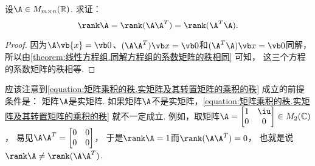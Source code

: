 \begin{example}
设\(\A \in M_{m \times n}(\mathbb{R})\).
求证：\begin{equation}\label{equation:矩阵乘积的秩.实矩阵及其转置矩阵的乘积的秩}
	\rank\A = \rank(\A\A^T) = \rank(\A^T\A).
\end{equation}
\begin{proof}
因为\(\A\vb{x}=\vb0\)、\((\A\A^T)\x=\vb0\)和\((\A^T\A)\x=\vb0\)同解，
所以由\cref{theorem:线性方程组.同解方程组的系数矩阵的秩相同} 可知，
这三个方程的系数矩阵的秩相等.
\end{proof}
\end{example}
\begin{remark}
应该注意到\cref{equation:矩阵乘积的秩.实矩阵及其转置矩阵的乘积的秩} 成立的前提条件是：
矩阵\(\A\)是实矩阵.
如果矩阵\(\A\)不是实矩阵，\cref{equation:矩阵乘积的秩.实矩阵及其转置矩阵的乘积的秩} 就不一定成立.
例如，取矩阵\(\A = \begin{bmatrix}
	1 & \iu \\
	0 & 0
\end{bmatrix}
\in M_2(\mathbb{C})\)，
易见\(\A \A^T = \begin{bmatrix}
	0 & 0 \\
	0 & 0
\end{bmatrix}\)，
于是\(\rank\A=1\)而\(\rank(\A\A^T)=0\)，
也就是说\(\rank\A\neq\rank(\A\A^T)\).
\end{remark}
